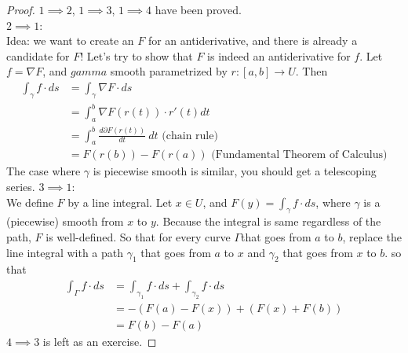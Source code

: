 \documentclass[11pt,openany]{book}
\begin{document}
	\begin{proof}
		$1 \implies 2$, $1 \implies 3$, $1 \implies 4$ have been proved.\\
		$2 \implies 1$:\\
		Idea: we want to create an $F$ for an antiderivative, and there is already a candidate for $F$!
		Let's try to show that $F$ is indeed an antiderivative for $f$.
		Let $f=\nabla F$, and $gamma$ smooth parametrized by $r:[a,b]\to U$. Then
		\begin{align*}
			\int_\gamma f \cdot ds &= \int_\gamma \nabla F \cdot ds \\
			&= \int_a^b \nabla F(r(t)) \cdot r'(t) dt \\
			&= \int_a^b \frac{d \partial F(r(t))}{dt} \ dt \textrm{ (chain rule)}\\
			&= F(r(b)) - F(r(a)) \textrm{ (Fundamental Theorem of Calculus)}
		\end{align*} 
		The case where $\gamma$ is piecewise smooth is similar, you should get a telescoping series.
		$3 \implies 1$:\\
		We define $F$ by a line integral.
		Let $x \in U$, and $F(y) = \int_\gamma f \cdot ds$, where $\gamma$ is a (piecewise) smooth from $x$ to $y$.
		Because the integral is same regardless of the path, $F$ is well-defined.
		So that for every curve $\Gamma$that goes from $a$ to $b$, replace the line integral with a path $\gamma_1$ that goes from $a$ to $x$
		and $\gamma_2$ that goes from $x$ to $b$.
		so that \begin{align*}
			\int_\Gamma f\cdot ds &= \int_{\gamma_1} f\cdot ds + \int_{\gamma_2} f\cdot ds \\
			&= - (F(a) - F(x) ) + (F(x) + F(b))\\
			&= F(b) - F(a)
		\end{align*}
		$4 \implies 3$ is left as an exercise. 
	\end{proof}
	
\end{document}
